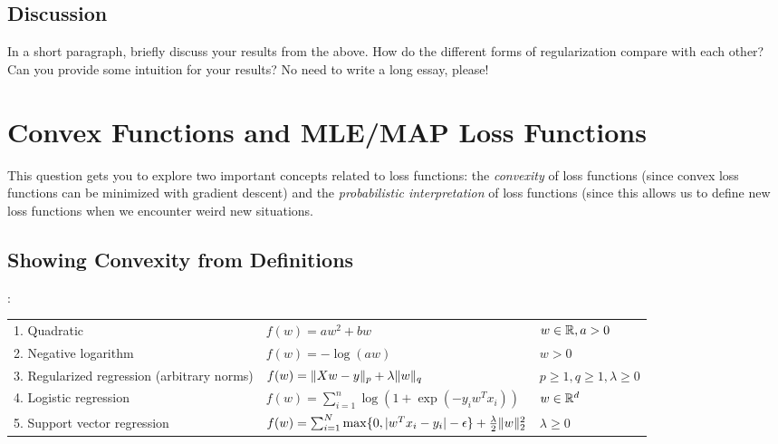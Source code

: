 \documentclass{article}
\begin{document}
\subsection{Discussion}

In a short paragraph, briefly discuss your results from the above. How do the 
different forms of regularization compare with each other? 
Can you provide some intuition for your results? No need to write a long essay, please! 


\section{Convex Functions and MLE/MAP Loss Functions}

This question gets you to explore two important concepts related to loss functions: the \emph{convexity} of loss functions (since convex loss functions can be minimized with gradient descent) and the \emph{probabilistic interpretation} of loss functions (since this allows us to define new loss functions when we encounter weird new situations.


\subsection{Showing Convexity from Definitions}

:
\begin{center}
\begin{tabular}{lll}
1. Quadratic & $f(w) = aw^2 + bw$ & $w \in \mathbb{R}, a > 0$ \\
2. Negative logarithm & $f(w) = -\log(aw) $ & $w > 0$\\
3. Regularized regression (arbitrary norms) &  $f(w) = \|Xw - y\|_p + \lambda\|w\|_q$ & $p \geq 1, q \geq 1, \lambda \geq 0$\\
4. Logistic regression & $f(w) = \sum_{i=1}^n \log(1+\exp(-y_iw^Tx_i)) $& $w \in \mathbb{R}^d$\\
5. Support vector regression & $f(w) = \sum_{i=1}^N\max\{0, |w^Tx_i - y_i| - \epsilon\} + \frac{\lambda}{2}\|w\|_2^2$ & $\lambda \geq 0$\\
\end{tabular}
\end{center}
\end{document}
